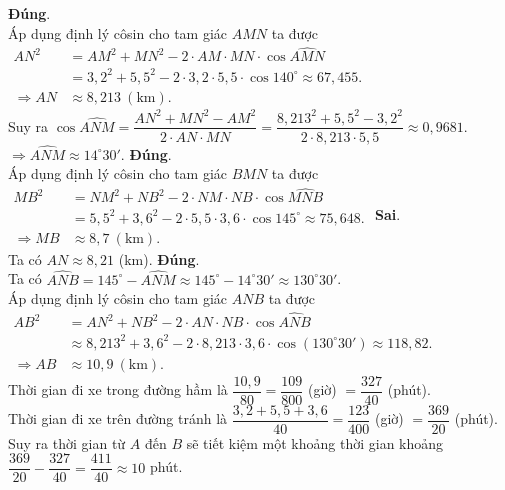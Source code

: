 \begin{ex}
{\begin{center}
		\end{center}
		\begin{itemchoice}
			\itemch \textbf{Đúng}.\\
			Áp dụng định lý côsin cho tam giác $AMN$ ta được\\
			$\begin{aligned} AN^2&=AM^2+MN^2-2\cdot AM\cdot MN\cdot\cos\widehat{AMN}\\
				&=3{,}2^2+5{,}5^2-2\cdot 3{,}2\cdot5{,}5\cdot\cos140^\circ\approx67{,}455.\\
				\Rightarrow AN&\approx 8{,}213 ~\mathrm{(km)}.\end{aligned}$\\
			Suy ra $\cos\widehat{ANM}=\dfrac{AN^2+MN^2-AM^2}{2\cdot AN\cdot MN}=\dfrac{8{,}213^2+5{,}5^2-3{,}2^2}{2\cdot8{,}213\cdot5{,}5}\approx0{,}9681$.\\
			$\Rightarrow \widehat{ANM}\approx 14^\circ30'$.
			\itemch \textbf{Đúng}.\\
			Áp dụng định lý côsin cho tam giác $BMN$ ta được\\
			$\begin{aligned} MB^2&=NM^2+NB^2-2\cdot NM\cdot NB\cdot\cos\widehat{MNB}\\
				&=5{,}5^2+3{,}6^2-2\cdot 5{,}5\cdot3{,}6\cdot\cos145^\circ\approx75{,}648.\\
				\Rightarrow MB&\approx 8{,}7 ~\mathrm{(km)}.\end{aligned}$
			\itemch \textbf{Sai}.\\
			Ta có $AN \approx 8{,}21$ (km).
			\itemch \textbf{Đúng}.\\
			Ta có $\widehat{ANB}=145^\circ-\widehat{ANM}\approx 145^\circ-14^\circ30'\approx 130^\circ30'$.\\
			Áp dụng định lý côsin cho tam giác $ANB$ ta được\\
			$\begin{aligned} AB^2&=AN^2+NB^2-2\cdot AN\cdot NB\cdot\cos\widehat{ANB}\\
				&\approx 8{,}213^2+3{,}6^2-2\cdot 8{,}213\cdot3{,}6\cdot\cos\left(130^\circ30'\right)\approx118{,}82.\\
				\Rightarrow AB&\approx 10{,}9 ~\mathrm{(km)}.\end{aligned}$\\
			Thời gian đi xe trong đường hầm là $\dfrac{10{,}9}{80}=\dfrac{109}{800}$ (giờ) $= \dfrac{327}{40}$ (phút).\\
			Thời gian đi xe trên đường tránh là $\dfrac{3{,}2+5{,}5+3{,}6}{40}=\dfrac{123}{400}$ (giờ) $=\dfrac{369}{20}$ (phút).\\
			Suy ra thời gian từ $A$ đến $B$ sẽ tiết kiệm một khoảng thời gian khoảng\break  $\dfrac{369}{20}-\dfrac{327}{40}=\dfrac{411}{40}\approx 10$ phút.
		\end{itemchoice}
	}
\end{ex}

